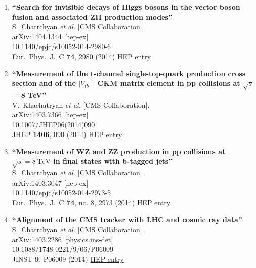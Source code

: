 \documentclass{article}
\begin{document}
\begin{enumerate}
\item%
{\bf ``Search for invisible decays of Higgs bosons in the vector boson fusion and associated ZH production modes''}
  \\{}S.~Chatrchyan {\it et al.} [CMS Collaboration].
  \\{}arXiv:1404.1344 [hep-ex]
    \\{}10.1140/epjc/s10052-014-2980-6
\\{}Eur.\ Phys.\ J.\ C {\bf 74}, 2980 (2014) %
\href{http://inspirehep.net/record/1288709}{HEP entry}


\item%
{\bf ``Measurement of the t-channel single-top-quark production cross section and of the $\mid V_{tb} \mid$ CKM matrix element in pp collisions at $\sqrt{s}$= 8 TeV''}
  \\{}V.~Khachatryan {\it et al.} [CMS Collaboration].
  \\{}arXiv:1403.7366 [hep-ex]
    \\{}10.1007/JHEP06(2014)090
\\{}JHEP {\bf 1406}, 090 (2014) %
\href{http://inspirehep.net/record/1287736}{HEP entry}


\item%
{\bf ``Measurement of WZ and ZZ production in pp collisions at $\sqrt{s} = 8\,\text {TeV} $ in final states with b-tagged jets''}
  \\{}S.~Chatrchyan {\it et al.} [CMS Collaboration].
  \\{}arXiv:1403.3047 [hep-ex]
    \\{}10.1140/epjc/s10052-014-2973-5
\\{}Eur.\ Phys.\ J.\ C {\bf 74}, no. 8, 2973 (2014) %
\href{http://inspirehep.net/record/1285492}{HEP entry}


\item%
{\bf ``Alignment of the CMS tracker with LHC and cosmic ray data''}
  \\{}S.~Chatrchyan {\it et al.} [CMS Collaboration].
  \\{}arXiv:1403.2286 [physics.ins-det]
    \\{}10.1088/1748-0221/9/06/P06009
\\{}JINST {\bf 9}, P06009 (2014) %
\href{http://inspirehep.net/record/1285228}{HEP entry}



\end{enumerate}
\end{document}
